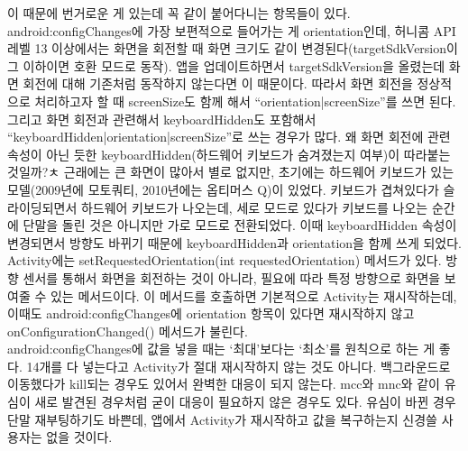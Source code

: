 이 때문에 번거로운 게 있는데 꼭 같이 붙어다니는 항목들이 있다.
android:configChanges에 가장 보편적으로 들어가는 게 orientation인데, 허니콤 API 레벨 13 이상에서는 화면을 회전할 때 화면 크기도 같이 변경된다(targetSdkVersion이 그 이하이면 호환 모드로 동작).
앱을 업데이트하면서 targetSdkVersion을 올렸는데 화면 회전에 대해 기존처럼 동작하지 않는다면 이 때문이다. 
따라서 화면 회전을 정상적으로 처리하고자 할 때 screenSize도 함께 해서 ``orientation|screenSize''를 쓰면 된다.\\

그리고 화면 회전과 관련해서 keyboardHidden도 포함해서 ``keyboardHidden|orientation|screenSize''로 쓰는 경우가 많다.
왜 화면 회전에 관련 속성이 아닌 듯한 keyboardHidden(하드웨어 키보드가 숨겨졌는지 여부)이 따라붙는 것일까?ㅊ
근래에는 큰 화면이 많아서 별로 없지만, 초기에는 하드웨어 키보드가 있는 모델(2009년에 모토쿼티, 2010년에는 옵티머스 Q)이 있었다.
키보드가 겹쳐있다가 슬라이딩되면서 하드웨어 키보드가 나오는데, 세로 모드로 있다가 키보드를 나오는 순간에 단말을 돌린 것은 아니지만 가로 모드로 전환되었다. 이때 keyboardHidden 속성이 변경되면서 방향도 바뀌기 때문에 keyboardHidden과 orientation을 함께 쓰게 되었다.\\

Activity에는 setRequestedOrientation(int requestedOrientation) 메서드가 있다. 방향 센서를 통해서 화면을 회전하는 것이 아니라, 필요에 따라 특정 방향으로 화면을 보여줄 수 있는 메서드이다. 이 메서드를 호출하면 기본적으로 Activity는 재시작하는데, 이때도 android:configChanges에 orientation 항목이 있다면 재시작하지 않고 onConfigurationChanged() 메서드가 불린다.\\

android:configChanges에 값을 넣을 때는 `최대'보다는 `최소'를 원칙으로 하는 게 좋다. 14개를 다 넣는다고 Activity가 절대 재시작하지 않는 것도 아니다. 백그라운드로 이동했다가 kill되는 경우도 있어서 완벽한 대응이 되지 않는다. mcc와 mnc와 같이 유심이 새로 발견된 경우처럼 굳이 대응이 필요하지 않은 경우도 있다. 유심이 바뀐 경우 단말 재부팅하기도 바쁜데, 앱에서 Activity가 재시작하고 값을 복구하는지 신경쓸 사용자는 없을 것이다.\\

